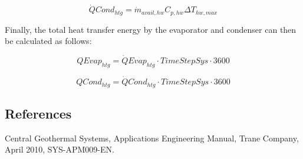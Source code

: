 \begin{equation}
\dot QCon{d_{htg}} = {\dot m_{avail,hw}}{C_{p,hw}}\Delta {T_{hw,max}}
\end{equation}

Finally, the total heat transfer energy by the evaporator and condenser can then be calculated as follows:

\begin{equation}
QEva{p_{htg}} = \dot QEva{p_{htg}} \cdot TimeStepSys \cdot 3600
\end{equation}

\begin{equation}
QCon{d_{htg}} = \dot QCon{d_{htg}} \cdot TimeStepSys \cdot 3600
\end{equation}

\subsection{References}\label{references-008}

Central Geothermal Systems, Applications Engineering Manual, Trane Company, April 2010, SYS-APM009-EN.
